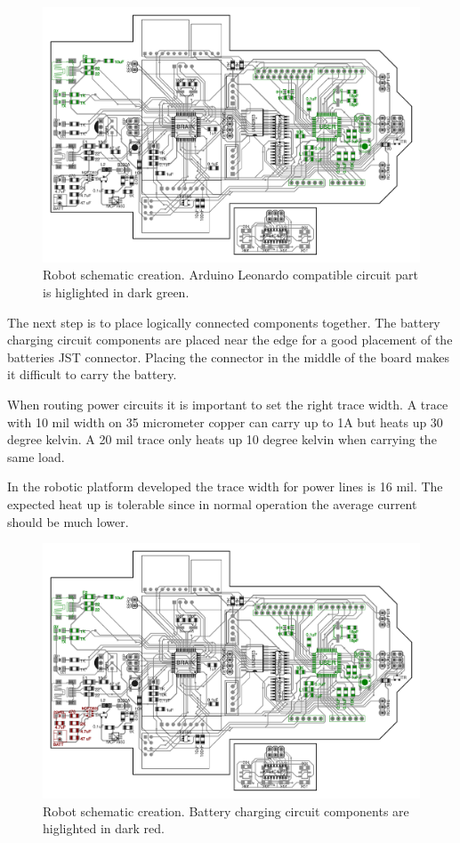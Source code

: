 \begin{figure}[H]
  \centering
  \includegraphics[width=\textwidth]{images/schematic/robot_schematic_user.pdf}
  \caption{Robot schematic creation. Arduino Leonardo compatible circuit part is higlighted in dark green.}
\end{figure}

The next step is to place logically connected components together. The battery charging circuit components are placed near the edge for a good placement of the batteries JST connector. Placing the connector in the middle of the board makes it difficult to carry the battery.

When routing power circuits it is important to set the right trace width. A trace with 10 mil width on 35 micrometer copper can carry up to 1A but heats up 30 degree kelvin. A 20 mil trace only heats up 10 degree kelvin when carrying the same load. \cite[p. 841]{horowitz1989art} 

In the robotic platform developed the trace width for power lines is 16 mil. The expected heat up is tolerable since in normal operation the average current should be much lower.

\begin{figure}[H]
  \centering
  \includegraphics[width=\textwidth]{images/schematic/robot_schematic_battery.pdf}
  \caption{Robot schematic creation. Battery charging circuit components are higlighted in dark red.}
\end{figure}

